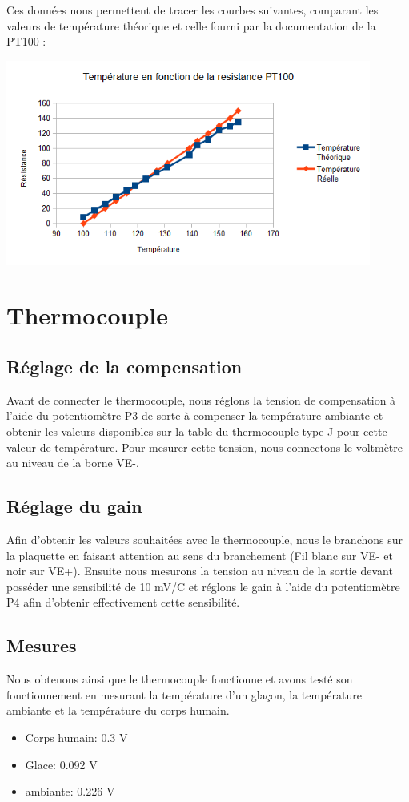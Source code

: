 \documentclass[a4paper,12pt]{article}
\begin{document}
      \par Ces données nous permettent de tracer les courbes suivantes, comparant les valeurs de température théorique et celle fourni par la documentation de la PT100 :
			\begin{center}
				\includegraphics[width=12cm]{../Images/GraphPT100.png}
			\end{center}
    \newpage

  \section{Thermocouple}
		\subsection{Réglage de la compensation}
			\par Avant de connecter le thermocouple, nous réglons la tension de compensation à l'aide du potentiomètre P3 de sorte à compenser la température ambiante et obtenir les valeurs disponibles sur la table du thermocouple type J pour cette valeur de température. Pour mesurer cette tension, nous connectons le voltmètre au niveau de la borne VE-.

		\subsection{Réglage du gain}
			\par Afin d'obtenir les valeurs souhaitées avec le thermocouple, nous le branchons sur la plaquette en faisant attention au sens du branchement (Fil blanc sur VE- et noir sur VE+). Ensuite nous mesurons la tension au niveau de la sortie devant posséder une sensibilité de 10 mV/{\degre}C et réglons le gain à l'aide du potentiomètre P4 afin d'obtenir effectivement cette sensibilité.

		\subsection{Mesures}
			\par Nous obtenons ainsi que le thermocouple fonctionne et avons testé son fonctionnement en mesurant la température d'un glaçon, la température ambiante et la température du corps humain.
      		\begin{itemize}
				\item Corps humain: 0.3 V
				\item Glace: 0.092 V
				\item ambiante: 0.226 V
			\end{itemize}
\end{document}
